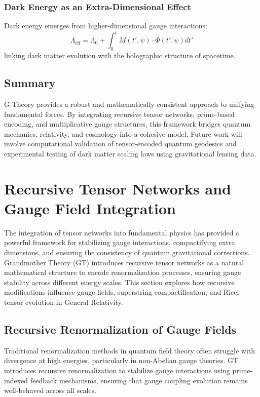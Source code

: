 \documentclass{article}
\theoremstyle{plain}
\begin{document}
\subsubsection{Dark Energy as an Extra-Dimensional Effect}
Dark energy emerges from higher-dimensional gauge interactions:
\begin{equation}
\Lambda_{\text{eff}} = \Lambda_0 + \int_0^t M(t', \psi) \cdot \Phi(t', \psi) dt'
\end{equation}
linking dark matter evolution with the holographic structure of spacetime.

\subsection{Summary}

G-Theory provides a robust and mathematically consistent approach to unifying fundamental forces. By integrating recursive tensor networks, prime-based encoding, and multiplicative gauge structures, this framework bridges quantum mechanics, relativity, and cosmology into a cohesive model. Future work will involve computational validation of tensor-encoded quantum geodesics and experimental testing of dark matter scaling laws using gravitational lensing data.


\section{Recursive Tensor Networks and Gauge Field Integration}

The integration of tensor networks into fundamental physics has provided a powerful framework for stabilizing gauge interactions, compactifying extra dimensions, and ensuring the consistency of quantum gravitational corrections. Grandmother Theory (GT) introduces recursive tensor networks as a natural mathematical structure to encode renormalization processes, ensuring gauge stability across different energy scales. This section explores how recursive modifications influence gauge fields, superstring compactification, and Ricci tensor evolution in General Relativity.

\subsection{Recursive Renormalization of Gauge Fields}
Traditional renormalization methods in quantum field theory often struggle with divergence at high energies, particularly in non-Abelian gauge theories. GT introduces recursive renormalization to stabilize gauge interactions using prime-indexed feedback mechanisms, ensuring that gauge coupling evolution remains well-behaved across all scales.
\end{document}
